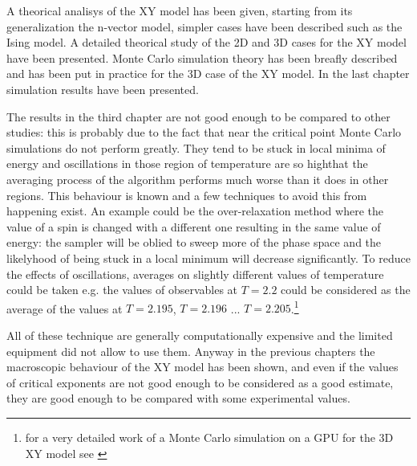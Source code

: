 A theorical analisys of the XY model has been given, starting from its
generalization the n-vector model, simpler cases have been described such as the
Ising model. A detailed theorical study of the 2D and 3D cases for the XY model have been
presented. Monte Carlo simulation theory has been breafly described and has been
put in practice for the 3D case of the XY model. In the last chapter simulation results
have been presented.

The results in the third chapter are not good enough to be compared to other
studies: this is probably due to the fact that near the critical point Monte
Carlo simulations do not perform greatly. They tend to be stuck in
local minima of energy and oscillations in those region of temperature are so highthat 
the averaging process of the algorithm performs much worse than it does in other
regions. This behaviour is known and a few techniques to avoid this from happening
exist. An example could be the over-relaxation method where the value of
a spin is changed with a different one resulting in the same value of energy: the
sampler will be oblied to sweep more of the phase space and the likelyhood of 
being stuck in a local minimum will decrease significantly. To reduce the
effects of oscillations, averages on slightly different values of temperature
could be taken e.g. the values of observables at $T=2.2$ could be considered 
as the average of the values at $T = 2.195$, $T=2.196$ ... $T=2.205$.\footnote{for
a very detailed work of a Monte Carlo simulation on a GPU for the 3D XY model 
see \cite{Lan}}

All of these technique are generally computationally expensive and the limited
equipment did not allow to use them. Anyway in the previous chapters the 
macroscopic behaviour of the XY model has been shown, and even if the values of
critical exponents are not good enough to be considered as a good estimate, 
they are good enough to be compared with some experimental values.


